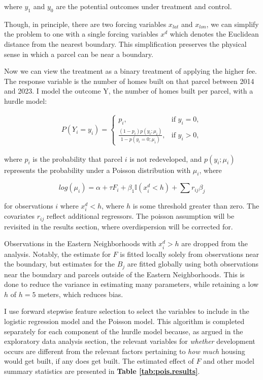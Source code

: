 \documentclass[a4paper,12pt]{article}
\begin{document}
where $y_1$ and $y_0$ are the potential outcomes under treatment and control.

Though, in principle, there are two forcing variables $x_{lat}$ and $x_{lon}$, we can simplify the problem to one with a single forcing variables $x^{d}$ which denotes the Euclidean distance from the nearest boundary. This simplification preserves the physical sense in which a parcel can be near a boundary.\cite{keele2015geographic}

Now we can view the treatment as a binary treatment of applying the higher fee. The response variable is the number of homes built on that parcel between 2014 and 2023. I model the outcome Y, the number of homes built per parcel, with a hurdle model:

\begin{align}
P(Y_i = y_i) = \begin{cases}
    p_i, & \text{if } y_i = 0, \\
    \frac{(1 - p_i) p(y_i; \mu_i)}{1 - p(y_i=0; \mu_i)}, & \text{if } y_i > 0,
\end{cases}
\end{align}

where \( p_i \) is the probability that parcel $i$ is not redeveloped, and \( p(y_i; \mu_i) \) represents the probability under a Poisson distribution with \( \mu_i \), where

\begin{equation}
log(\mu_i) = \alpha + \tau F_i + \beta_1 \mathbb{I}(x^{d}_{i} < h) + \sum{r_{ij}\beta_j}
\end{equation}

for observations $i$ where $x^{d}_{i} < h$, where $h$ is some threshold greater than zero. The covariates $r_{ij}$ reflect additional regressors. The poisson assumption will be revisited in the results section, where overdispersion will be corrected for.

Observations in the Eastern Neighborhoods with $x^{d}_{i} > h$ are dropped from the analysis. Notably, the estimate for $F$ is fitted locally solely from observations near the boundary, but estimates for the $B_j$ are fitted globally using both observations near the boundary and parcels outside of the Eastern Neighborhoods. This is done to reduce the variance in estimating many parameters, while retaining a low $h$ of $h=5$ meters, which reduces bias.\cite{wooldridge2010econometric}

I use forward stepwise feature selection to select the variables to include in the logistic regression model and the Poisson model. This algorithm is completed separately for each component of the hurdle model because, as argued in the exploratory data analysis section, the relevant variables for \textit{whether} development occurs are different from the relevant factors pertaining to \textit{how much} housing would get built, if any does get built. The estimated effect of $F$ and other model summary statistics are presented in \textbf{Table \ref{tab:pois.results}}.
\end{document}
